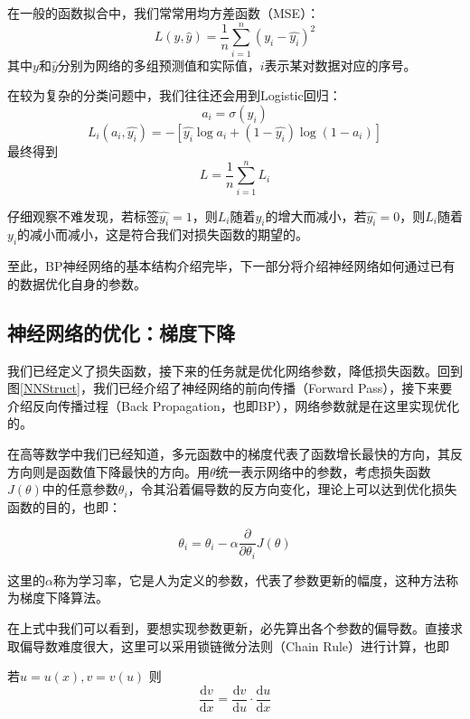 \documentclass[bwprint]{cumcmthesis}
\begin{document}
在一般的函数拟合中，我们常常用均方差函数（MSE）：
\[L(y, \hat{y}) =  \frac{1}{n}\sum\limits^{n}_{i=1}(y_i - \hat{y_i})^2\]
其中$y$和$\hat{y}$分别为网络的多组预测值和实际值，$i$表示某对数据对应的序号。

在较为复杂的分类问题中，我们往往还会用到Logistic回归：
\[a_i = \sigma(y_i)\]
\[L_i(a_i, \hat{y_i}) = -[\hat{y_i}\log a_i + (1-\hat{y_i})\log(1-a_i)]\]
最终得到
\[L = \frac{1}{n}\sum\limits^{n}_{i=1}L_i\]

仔细观察不难发现，若标签$\hat{y_i}=1$，则$L_i$随着$y_i$的增大而减小，若$\hat{y_i}=0$，则$L_i$随着$y_i$的减小而减小，这是符合我们对损失函数的期望的。

\vspace{6mm}

至此，BP神经网络的基本结构介绍完毕，下一部分将介绍神经网络如何通过已有的数据优化自身的参数。

\subsection{神经网络的优化：梯度下降}

我们已经定义了损失函数，接下来的任务就是优化网络参数，降低损失函数。回到图\ref{NNStruct}，我们已经介绍了神经网络的前向传播（Forward Pass），接下来要介绍反向传播过程（Back Propagation，也即BP），网络参数就是在这里实现优化的。

在高等数学中我们已经知道，多元函数中的梯度代表了函数增长最快的方向，其反方向则是函数值下降最快的方向。用$\theta$统一表示网络中的参数，考虑损失函数$J(\theta)$中的任意参数$\theta_i$，令其沿着偏导数的反方向变化，理论上可以达到优化损失函数的目的，也即：

\[\theta_i = \theta_i - \alpha\frac{\partial}{\partial\theta_i}J(\theta)\]

这里的$\alpha$称为学习率，它是人为定义的参数，代表了参数更新的幅度，这种方法称为梯度下降算法。

在上式中我们可以看到，要想实现参数更新，必先算出各个参数的偏导数。直接求取偏导数难度很大，这里可以采用锁链微分法则（Chain Rule）进行计算，也即

若$u = u(x),v = v(u)$ 则 
\[\frac{\mathrm{d}v}{\mathrm{d}x} = \frac{\mathrm{d}v}{\mathrm{d}u} \cdot \frac{\mathrm{d}u}{\mathrm{d}x}\]
\end{document}
